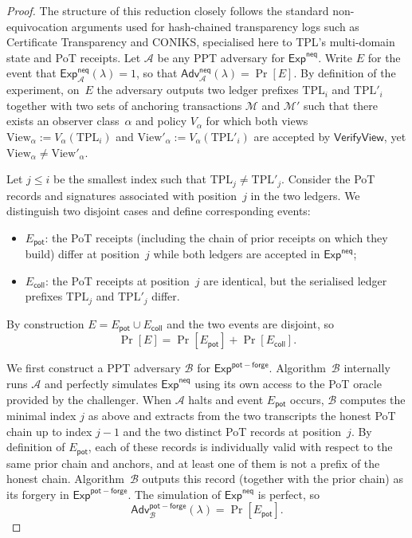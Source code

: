 \documentclass[11pt]{article}
\begin{document}
\begin{proof}
The structure of this reduction closely follows the standard non-equivocation arguments used for hash-chained transparency logs such as Certificate Transparency and CONIKS, specialised here to TPL's multi-domain state and PoT receipts.
Let $\mathcal{A}$ be any PPT adversary for $\mathsf{Exp}^{\mathsf{neq}}$.
Write $E$ for the event that
$\mathsf{Exp}^{\mathsf{neq}}_{\mathcal{A}}(\lambda)=1$, so that
$\mathsf{Adv}^{\mathsf{neq}}_{\mathcal{A}}(\lambda) = \Pr[E]$.
By definition of the experiment, on~$E$ the adversary outputs two ledger
prefixes $\mathrm{TPL}_i$ and $\mathrm{TPL}'_i$ together with two sets of
anchoring transactions $\mathcal{M}$ and $\mathcal{M}'$ such that there exists
an observer class~$\alpha$ and policy $V_\alpha$ for which both
views $\mathrm{View}_\alpha := V_\alpha(\mathrm{TPL}_i)$ and
$\mathrm{View}'_\alpha := V_\alpha(\mathrm{TPL}'_i)$ are accepted by
$\mathsf{VerifyView}$, yet
$\mathrm{View}_\alpha \neq \mathrm{View}'_\alpha$.

Let $j \le i$ be the smallest index such that
$\mathrm{TPL}_j \neq \mathrm{TPL}'_j$.
Consider the PoT records and signatures associated with position~$j$ in the
two ledgers.
We distinguish two disjoint cases and define corresponding events:
\begin{itemize}[noitemsep]
  \item $E_{\mathsf{pot}}$: the PoT receipts (including the chain of prior
        receipts on which they build) differ at position~$j$ while both ledgers
        are accepted in $\mathsf{Exp}^{\mathsf{neq}}$;
  \item $E_{\mathsf{coll}}$: the PoT receipts at position~$j$ are identical,
        but the serialised ledger prefixes $\mathrm{TPL}_j$ and
        $\mathrm{TPL}'_j$ differ.
\end{itemize}
By construction $E = E_{\mathsf{pot}} \cup E_{\mathsf{coll}}$ and the two
events are disjoint, so
\[
  \Pr[E] = \Pr[E_{\mathsf{pot}}] + \Pr[E_{\mathsf{coll}}].
\]

We first construct a PPT adversary $\mathcal{B}$ for
$\mathsf{Exp}^{\mathsf{pot-forge}}$.
Algorithm~$\mathcal{B}$ internally runs $\mathcal{A}$ and perfectly simulates
$\mathsf{Exp}^{\mathsf{neq}}$ using its own access to the PoT oracle provided
by the challenger.
When $\mathcal{A}$ halts and event $E_{\mathsf{pot}}$ occurs, $\mathcal{B}$
computes the minimal index $j$ as above and extracts from the two transcripts
the honest PoT chain up to index $j-1$ and the two distinct PoT records at
position~$j$.
By definition of $E_{\mathsf{pot}}$, each of these records is individually
valid with respect to the same prior chain and anchors, and at least one of
them is not a prefix of the honest chain.
Algorithm~$\mathcal{B}$ outputs this record (together with the prior chain) as
its forgery in $\mathsf{Exp}^{\mathsf{pot-forge}}$.
The simulation of $\mathsf{Exp}^{\mathsf{neq}}$ is perfect, so
\[
  \mathsf{Adv}^{\mathsf{pot-forge}}_{\mathcal{B}}(\lambda)
  = \Pr[E_{\mathsf{pot}}].
\]


\end{proof}
\end{document}
